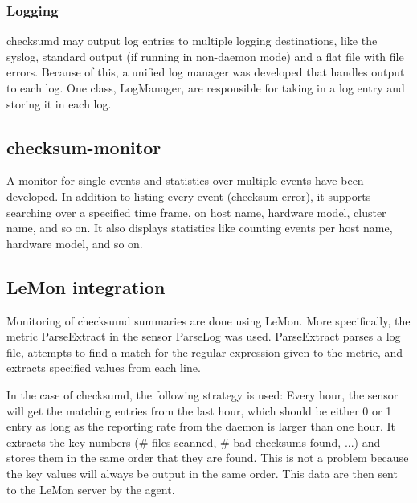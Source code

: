 \subsubsection{Logging}
checksumd may output log entries to multiple logging destinations, like the syslog, standard output (if running in non-daemon mode) and a flat file with file errors. Because of this, a unified log manager was developed that handles output to each log. One class, LogManager, are responsible for taking in a log entry and storing it in each log.  

\subsection{checksum-monitor}
A monitor for single events and statistics over multiple events have been developed. In addition to listing every event (checksum error), it supports searching over a specified time frame, on host name, hardware model, cluster name, and so on. It also displays statistics like counting events per host name, hardware model, and so on.

\subsection{LeMon integration}
\label{sec:lemon_integration}
Monitoring of checksumd summaries are done using LeMon. More specifically, the metric ParseExtract in the sensor ParseLog was used. ParseExtract parses a log file, attempts to find a match for the regular expression given to the metric, and extracts specified values from each line. 

In the case of checksumd, the following strategy is used: Every hour, the sensor will get the matching entries from the last hour, which should be either 0 or 1 entry as long as the reporting rate from the daemon is larger than one hour. It extracts the key numbers (\# files scanned, \# bad checksums found, ...) and stores them in the same order that they are found. This is not a problem because the key values will always be output in the same order. This data are then sent to the LeMon server by the agent.
